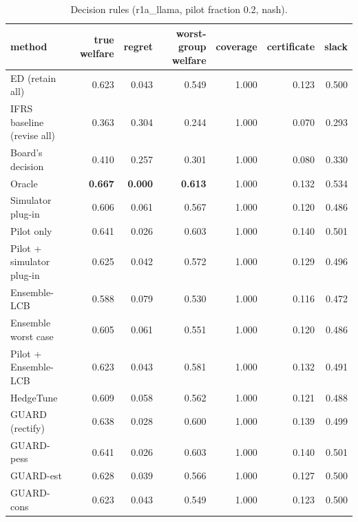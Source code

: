 \begin{table}[t]
\centering
\small
\begin{tabular}{lrrrrrr}
\toprule
method & true welfare & regret & worst-group welfare & coverage & certificate & slack \\
\midrule
ED (retain all) & 0.623 & 0.043 & 0.549 & 1.000 & 0.123 & 0.500 \\
IFRS baseline (revise all) & 0.363 & 0.304 & 0.244 & 1.000 & 0.070 & 0.293 \\
Board's decision & 0.410 & 0.257 & 0.301 & 1.000 & 0.080 & 0.330 \\
Oracle & \textbf{0.667} & \textbf{0.000} & \textbf{0.613} & 1.000 & 0.132 & 0.534 \\
Simulator plug-in & 0.606 & 0.061 & 0.567 & 1.000 & 0.120 & 0.486 \\
Pilot only & 0.641 & 0.026 & 0.603 & 1.000 & 0.140 & 0.501 \\
Pilot + simulator plug-in & 0.625 & 0.042 & 0.572 & 1.000 & 0.129 & 0.496 \\
Ensemble-LCB & 0.588 & 0.079 & 0.530 & 1.000 & 0.116 & 0.472 \\
Ensemble worst case & 0.605 & 0.061 & 0.551 & 1.000 & 0.120 & 0.486 \\
Pilot + Ensemble-LCB & 0.623 & 0.043 & 0.581 & 1.000 & 0.132 & 0.491 \\
HedgeTune & 0.609 & 0.058 & 0.562 & 1.000 & 0.121 & 0.488 \\
GUARD (rectify) & 0.638 & 0.028 & 0.600 & 1.000 & 0.139 & 0.499 \\
GUARD-pess & 0.641 & 0.026 & 0.603 & 1.000 & 0.140 & 0.501 \\
GUARD-est & 0.628 & 0.039 & 0.566 & 1.000 & 0.127 & 0.500 \\
GUARD-cons & 0.623 & 0.043 & 0.549 & 1.000 & 0.123 & 0.500 \\
\bottomrule
\end{tabular}
\caption{Decision rules (r1a\_llama, pilot fraction 0.2, nash).}
\label{tab:methods-nash}
\end{table}
